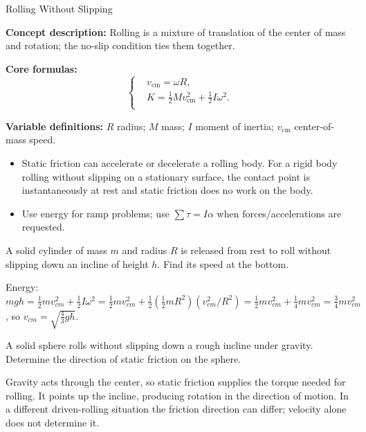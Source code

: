 \begin{KnowledgePoint}{Rolling Without Slipping \Core}
  \KPFormulas
  \begin{formulabox}
  \textbf{Concept description:} Rolling is a mixture of translation of the center of mass and rotation; the no-slip condition ties them together.

  \textbf{Core formulas:}
  \[
  \left\{\begin{aligned}
    &v_{\text{cm}}=\omega R,\\
    &K=\tfrac12 M v_{\text{cm}}^2+\tfrac12 I\omega^2.\\
  \end{aligned}\right.
  \]

  \textbf{Variable definitions:} $R$ radius; $M$ mass; $I$ moment of inertia; $v_{\text{cm}}$ center-of-mass speed.
  \end{formulabox}

  \KPHeuristics
  \begin{heuristicsbox}
  \begin{itemize}[leftmargin=*]
    \item Static friction can accelerate or decelerate a rolling body. For a rigid body rolling without slipping on a stationary surface, the contact point is instantaneously at rest and static friction does no work on the body.
    \item Use energy for ramp problems; use $\sum \tau=I\alpha$ when forces/accelerations are requested.
  \end{itemize}
  \end{heuristicsbox}

  \KPProblems
  \begin{cheatproblem}
  A solid cylinder of mass $m$ and radius $R$ is released from rest to roll without slipping down an incline of height $h$. Find its speed at the bottom.
  \begin{solutionbox}
  Energy: $mgh=\tfrac12 m v_{cm}^2+\tfrac12 I\omega^2=\tfrac12 m v_{cm}^2+\tfrac12(\tfrac12 mR^2)(v_{cm}^2/R^2)=\tfrac12 m v_{cm}^2+\tfrac14 m v_{cm}^2=\tfrac34 m v_{cm}^2$, so $v_{cm}=\sqrt{\tfrac{4}{3}gh}$.
  \end{solutionbox}
  \end{cheatproblem}
  \begin{cheatproblem}
  A solid sphere rolls without slipping down a rough incline under gravity. Determine the direction of static friction on the sphere.
  \begin{solutionbox}
  Gravity acts through the center, so static friction supplies the torque needed for rolling. It points up the incline, producing rotation in the direction of motion. In a different driven-rolling situation the friction direction can differ; velocity alone does not determine it.
  \end{solutionbox}
  \end{cheatproblem}
\end{KnowledgePoint}


